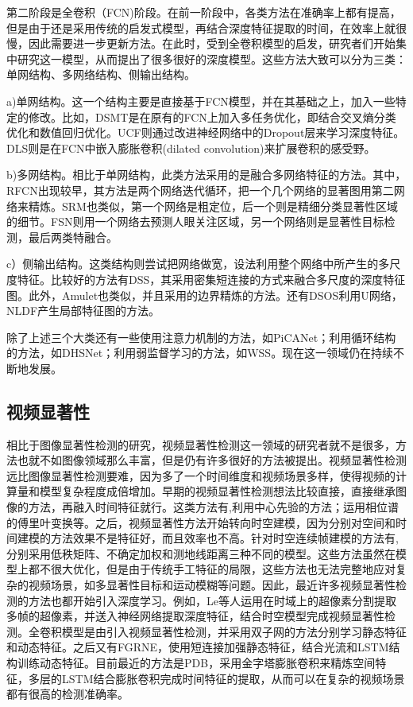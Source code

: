 第二阶段是全卷积（FCN)阶段。在前一阶段中，各类方法在准确率上都有提高，但是由于还是采用传统的启发式模型，再结合深度特征提取的时间，在效率上就很慢，因此需要进一步更新方法。在此时，受到全卷积模型的启发，研究者们开始集中研究这一模型，从而提出了很多很好的深度模型。这些方法大致可以分为三类：单网结构、多网络结构、侧输出结构。

a)单网结构。这一个结构主要是直接基于FCN模型，并在其基础之上，加入一些特定的修改。比如，DSMT\cite{li2016deepsaliency}是在原有的FCN上加入多任务优化，即结合交叉熵分类优化和数值回归优化。UCF\cite{Zhang_2017_ICCV_UCF}则通过改进神经网络中的Dropout层来学习深度特征。DLS\cite{8099548}则是在FCN中嵌入膨胀卷积(dilated convolution)来扩展卷积的感受野。

b)多网结构。相比于单网结构，此类方法采用的是融合多网络特征的方法。其中，RFCN\cite{wang2016saliency}出现较早，其方法是两个网络迭代循环，把一个几个网络的显著图用第二网络来精炼。SRM\cite{8237695}也类似，第一个网络是粗定位，后一个则是精细分类显著性区域的细节。FSN\cite{8237381}则用一个网络去预测人眼关注区域，另一个网络则是显著性目标检测，最后两类特融合。

c）侧输出结构。这类结构则尝试把网络做宽，设法利用整个网络中所产生的多尺度特征。比较好的方法有DSS\cite{DSSalCVPR2017}，其采用密集短连接的方式来融合多尺度的深度特征图。此外，Amulet\cite{Zhang_2017_ICCV_Amulet}也类似，并且采用的边界精炼的方法。还有DSOS\cite{8237382}利用U网络，NLDF\cite{8100181}产生局部特征图的方法。

除了上述三个大类还有一些使用注意力机制的方法，如PiCANet\cite{8578424}；利用循环结构的方法，如DHSNet\cite{liu2016dhsnet}；利用弱监督学习的方法，如WSS\cite{Wang2017Learning}。现在这一领域仍在持续不断地发展。

\subsection{视频显著性}
相比于图像显著性检测的研究，视频显著性检测这一领域的研究者就不是很多，方法也就不如图像领域那么丰富，但是仍有许多很好的方法被提出。视频显著性检测远比图像显著性检测要难，因为多了一个时间维度和视频场景多样，使得视频的计算量和模型复杂程度成倍增加。早期的视频显著性检测想法比较直接，直接继承图像的方法，再融入时间特征就行。这类方法有\cite{mahadevan2010spatiotemporal},利用中心先验的方法；\cite{guo2008spatio}运用相位谱的傅里叶变换等。之后，视频显著性方法开始转向时空建模，因为分别对空间和时间建模的方法效果不是特征好，而且效率也不高。针对时空连续帧建模的方法有\cite{chen2017video,fang2014video,wang2015consistent},分别采用低秩矩阵、不确定加权和测地线距离三种不同的模型。这些方法虽然在模型上都不很大优化，但是由于传统手工特征的局限，这些方法也无法完整地应对复杂的视频场景，如多显著性目标和运动模糊等问题。因此，最近许多视频显著性检测的方法也都开始引入深度学习。例如，Le等人\cite{8392732}运用在时域上的超像素分割提取多帧的超像素，并送入神经网络提取深度特征，结合时空模型完成视频显著性检测。全卷积模型是由\cite{8047320}引入视频显著性检测，并采用双子网的方法分别学习静态特征和动态特征。之后又有FGRNE\cite{li2018flow}，使用短连接加强静态特征，结合光流和LSTM结构训练动态特征。目前最近的方法是PDB\cite{song2018pyramid}，采用金字塔膨胀卷积来精炼空间特征，多层的LSTM结合膨胀卷积完成时间特征的提取，从而可以在复杂的视频场景都有很高的检测准确率。

